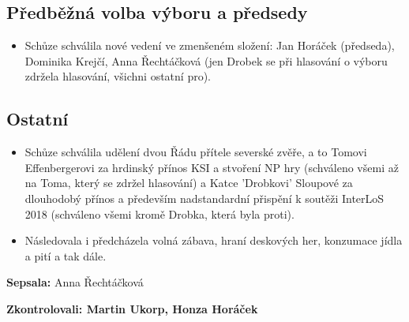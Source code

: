 \documentclass[11pt,a4paper]{article}
\begin{document}
\subsection*{Předběžná volba výboru a předsedy}
\begin{itemize}[itemsep=0pt]
\item Schůze schválila nové vedení ve zmenšeném složení: Jan Horáček (předseda), Dominika Krejčí, Anna Řechtáčková (jen Drobek se při hlasování o výboru zdržela hlasování, všichni ostatní pro).
\end{itemize}

\subsection*{Ostatní}
\begin{itemize}[itemsep=0pt]
\item Schůze schválila udělení dvou Řádu přítele severské zvěře, a to Tomovi Effenbergerovi za hrdinský přínos KSI a stvoření NP hry (schváleno všemi až na Toma, který se zdržel hlasování) a Katce 'Drobkovi' Sloupové za dlouhodobý přínos a především nadstandardní přispění k soutěži InterLoS 2018 (schváleno všemi kromě Drobka, která byla proti).
\item Následovala i předcházela volná zábava, hraní deskových her, konzumace jídla a pití a tak dále.
\end{itemize}

\textbf{Sepsala:} Anna Řechtáčková

\textbf{Zkontrolovali: Martin Ukorp, Honza Horáček} 
\end{document}
